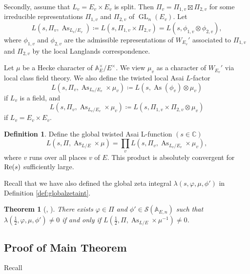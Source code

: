 \documentclass[11pt, reqno]{amsart}
\numberwithin{equation}{subsection}
\theoremstyle{plain}
\newtheorem{theorem}[proposition]{Theorem}
\theoremstyle{definition}
\newtheorem{definition}[proposition]{Definition}
\renewcommand{\AA}{\mathbb A}
\newcommand{\cS}{\mathcal S}
\DeclareMathOperator{\As}{As}
\DeclareMathOperator{\GL}{GL}
\renewcommand{\Re}{\textnormal{Re}}
\begin{document}
Secondly, assume that $L_v = E_v \times E_v$ is split. Then
$\Pi_v = \Pi_{1,v} \boxtimes \Pi_{2,v}$ for some
irreducible representations $\Pi_{1,v}$ and $\Pi_{2,v}$
of $\GL_n(E_v)$.
Let
\[
    L(s, \Pi_v, \As_{L_v/E_v})
    \coloneqq L(s, \Pi_{1,v} \times \Pi_{2,v})
    = L(s, \phi_{1,v} \otimes \phi_{2,v}),
\]
where $\phi_{1,v}$ and $\phi_{2,v}$ are the admissible
representations of $W_{E_v}'$ associated to
$\Pi_{1,v}$ and $\Pi_{2,v}$ by the local Langlands
correspondence.

Let $\mu$ be a Hecke character of $\AA_E^\times/E^\times$.
We view $\mu_v$ as a character of $W_{E_v}'$ via local
class field theory. We also define the
twisted local Asai $L$-factor
\[
    L(s, \Pi_v, \As_{L_v/E_v} \times \mu_v)
    \coloneqq L(s, \As(\phi_v) \otimes \mu_v)
\]
if $L_v$ is a field, and
\[
    L(s, \Pi_v, \As_{L_v/E_v} \times \mu_v)
    \coloneqq L(s, \Pi_{1,v} \times \Pi_{2,v}
    \otimes \mu_v)
\]
if $L_v = E_v \times E_v$.

\begin{definition}
Define the global twisted Asai L-function $(s \in \mathbb C)$
\[
    L(s, \Pi, \As_{L/E} \times \mu) = \prod_{v}
    L(s, \Pi_v, \As_{L_v/E_v} \times \mu_v),
\]
where $v$ runs over all places $v$ of $E$.
This product is absolutely convergent for
$\Re(s)$ sufficiently large.
\end{definition}

Recall that we have also defined the global
zeta integral $\lambda(s, \varphi, \mu, \phi')$
in Definition \ref{def:globalzetaint}.

\begin{theorem}[{\cite[Proposition, page 305; Theorem, page 309]{Flicker}, \cite{BP21}}]
\label{thm:asai}
There exists $\varphi \in \Pi$ and
$\phi' \in \cS(\AA_{E,n})$ such that
$\lambda(\frac12, \varphi, \mu, \phi') \neq 0$
if and only if $L(\frac12, \Pi, \As_{L/E}\times
\mu^{-1}) \neq 0$.
\end{theorem}

\subsection{Proof of Main Theorem}

Recall

\mainthm*
\end{document}
